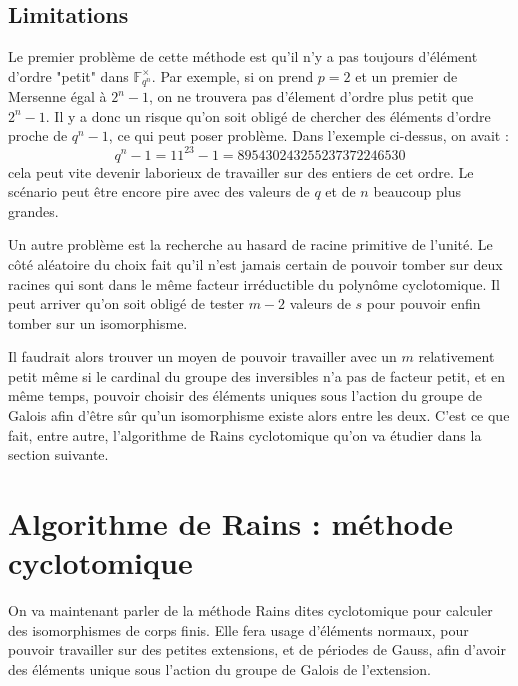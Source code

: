 \documentclass[a4paper]{article} %
\numberwithin{section}{part}
\numberwithin{equation}{section}
\newcommand\GF[1]{\mathbb{F}_{#1}}
\begin{document}
\subsection{Limitations}
Le premier problème de cette méthode est qu'il n'y a pas toujours d'élément
d'ordre "petit" dans $\GF{q^n}^{\times}$. Par exemple, si on prend $p = 2$ et un
premier de Mersenne égal à $2^n - 1$, on ne trouvera pas d'élement d'ordre plus
petit que $2^n - 1$. Il y a donc un risque qu'on soit obligé de chercher des
éléments d'ordre proche de $q^n - 1$, ce qui peut poser problème. Dans l'exemple
ci-dessus, on avait :
\[q^n - 1 = 11^{23} - 1 = 895430243255237372246530\]
cela peut vite devenir laborieux de travailler sur des entiers de cet ordre. Le
scénario peut être encore pire avec des valeurs de $q$ et de $n$ beaucoup plus
grandes.\par
Un autre problème est la recherche au hasard de racine primitive de l'unité. Le
côté aléatoire du choix fait qu'il n'est jamais certain de pouvoir tomber sur
deux racines qui sont dans le même facteur irréductible du polynôme
cyclotomique. Il peut arriver qu'on soit obligé de tester $m-2$ valeurs de $s$
pour pouvoir enfin tomber sur un isomorphisme.\par
Il faudrait alors trouver un moyen de pouvoir travailler avec un $m$
relativement petit même si le cardinal du groupe des inversibles n'a pas de
facteur petit, et en même temps, pouvoir choisir des éléments uniques sous
l'action du groupe de Galois afin d'être sûr qu'un isomorphisme existe alors
entre les deux. C'est ce que fait, entre autre, l'algorithme de Rains 
cyclotomique qu'on va étudier dans la section suivante.


\section{Algorithme de Rains : méthode cyclotomique}
On va maintenant parler de la méthode Rains dites cyclotomique pour calculer des
isomorphismes de corps finis. Elle fera usage d'éléments normaux, pour pouvoir
travailler sur des petites extensions, et de périodes de Gauss, afin d'avoir des
éléments unique sous l'action du groupe de Galois de l'extension.
\end{document}
